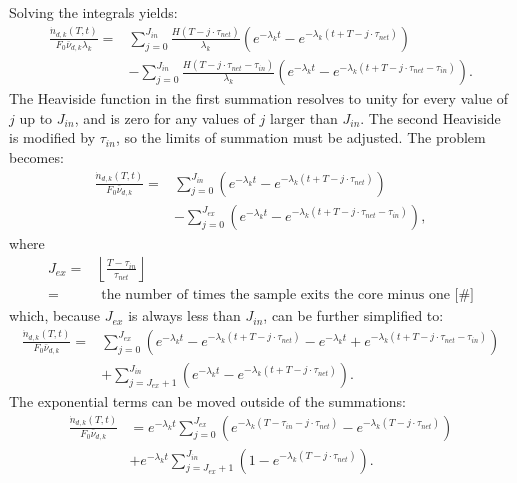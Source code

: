 Solving the integrals yields:
\begin{align}
\frac{\dot{n}_{d, k}(T, t)}{F_0 \bar{\nu}_{d, k} \lambda_k} =& \sum_{j=0}^{J_{in}} \frac{H(T- j \cdot \tau_{net})}{\lambda_k} \left( e^{-\lambda_k t} - e^{-\lambda_k (t + T - j \cdot \tau_{net})} \right) \nonumber\\
& - \sum_{j=0}^{J_{in}} \frac{H(T- j \cdot \tau_{net} - \tau_{in})}{\lambda_k} \left( e^{-\lambda_k t} - e^{-\lambda_k (t + T - j \cdot \tau_{net} -  \tau_{in})} \right).
\end{align}
The Heaviside function in the first summation resolves to unity for every value of $j$ up to $J_{in}$, and is zero for any values of $j$ larger than $J_{in}$.
The second Heaviside is modified by $\tau_{in}$, so the limits of summation must be adjusted.
The problem becomes:
\begin{align}
\frac{\dot{n}_{d, k}(T, t)}{F_0 \bar{\nu}_{d, k}} =& \sum_{j=0}^{J_{in}} \left( e^{-\lambda_k t} - e^{-\lambda_k (t + T - j \cdot \tau_{net})} \right) \nonumber\\
& - \sum_{j=0}^{J_{ex}} \left( e^{-\lambda_k t} - e^{-\lambda_k (t + T - j \cdot \tau_{net} - \tau_{in})} \right),
\end{align}
where
\begin{align}
    J_{ex} =& \left\lfloor \frac{T-\tau_{in}}{\tau_{net}} \right\rfloor \nonumber \\
     =& \text{ the number of times the sample exits the core minus one [$\#$]} \nonumber
\end{align}
which, because $J_{ex}$ is always less than $J_{in}$, can be further simplified to:
\begin{align}
\frac{\dot{n}_{d, k}(T, t)}{F_0 \bar{\nu}_{d, k}} =& \sum_{j=0}^{J_{ex}} \left( e^{-\lambda_k t} - e^{-\lambda_k (t + T - j \cdot \tau_{net})} - e^{-\lambda_k t} + e^{-\lambda_k (t + T - j \cdot \tau_{net} - \tau_{in})} \right) \nonumber \\ &+ \sum_{j=J_{ex}+1}^{J_{in}} \left( e^{-\lambda_k t} - e^{-\lambda_k (t + T - j \cdot \tau_{net})} \right).
\end{align}
The exponential terms can be moved outside of the summations:
\begin{align}
\frac{\dot{n}_{d, k}(T, t)}{F_0 \bar{\nu}_{d, k}} &= e^{-\lambda_k t} \sum_{j=0}^{J_{ex}} \left( e^{-\lambda_k (T - \tau_{in} - j \cdot \tau_{net})} - e^{-\lambda_k (T - j \cdot \tau_{net})}  \right) \nonumber \\ &+ e^{-\lambda_k t} \sum_{j=J_{ex}+1}^{J_{in}} \left( 1 - e^{-\lambda_k (T - j \cdot \tau_{net})} \right).
\label{eq:sumform}
\end{align}

